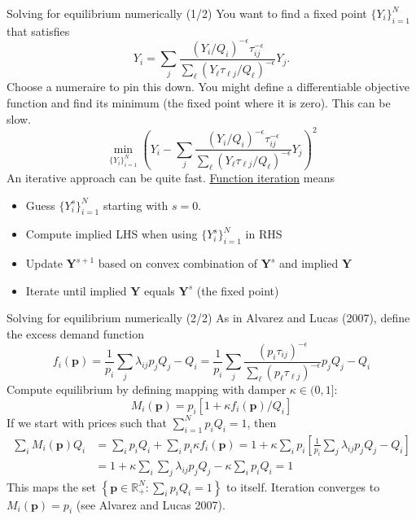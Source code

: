 \documentclass[10pt,notes=hide,aspectratio=169]{beamer}
\begin{document}
\begin{frame}{Solving for equilibrium numerically (1/2)}
You want to find a fixed point $\{Y_i\}_{i=1}^{N}$ that satisfies
$$
Y_i
=
\sum_j \frac{\left(Y_i/Q_i\right)^{-\epsilon} \tau_{ij}^{-\epsilon}}{\sum_{\ell} \left(Y_{\ell} \tau_{\ell j} / Q_{\ell}\right)^{-\epsilon}} Y_j
.$$
Choose a numeraire to pin this down.
You might define a differentiable objective function and find its minimum (the fixed point where it is zero).
This can be slow.
$$
\min_{\{Y_{i}\}_{i=1}^{N}}
\left(Y_i
-
\sum_j \frac{\left(Y_i/Q_i\right)^{-\epsilon} \tau_{ij}^{-\epsilon}}{\sum_{\ell} \left(Y_{\ell} \tau_{\ell j} / Q_{\ell}\right)^{-\epsilon}} Y_j
\right)^2
$$
An iterative approach can be quite fast. \href{https://raw.githack.com/AEM7130/class-repo/master/lecture-notes/04-optimization/04-optimization.html\#40}{Function iteration} means
\begin{itemize}
\item Guess $\{Y_{i}^{s}\}_{i=1}^{N}$ starting with $s=0$.
\item Compute implied LHS when using $\{Y_{i}^{s}\}_{i=1}^{N}$ in RHS
\item Update $\mathbf{Y}^{s+1}$ based on convex combination of $\mathbf{Y}^{s}$ and implied $\mathbf{Y}$
\item Iterate until implied $\mathbf{Y}$ equals $\mathbf{Y}^{s}$ (the fixed point)
\end{itemize}
\end{frame}
\begin{frame}{Solving for equilibrium numerically (2/2)}
As in Alvarez and Lucas (2007), define the excess demand function
$$
f_i(\mathbf{p}) 
=
\frac{1}{p_i} \sum_{j} \lambda_{ij} p_j Q_j - Q_i
=
\frac{1}{p_i} \sum_{j}
\frac{\left(p_i\tau_{ij}\right)^{-\epsilon}}{\sum_{\ell} \left(p_{\ell} \tau_{\ell j}\right)^{-\epsilon}}
p_j Q_j - Q_i
$$
Compute equilibrium by defining mapping with damper $\kappa \in (0,1]$:
$$M_i(\mathbf{p}) = p_i \left[1 + \kappa f_i(\mathbf{p}) / Q_{i}\right]$$
If we start with prices such that $\sum_{i=1}^{N} p_i Q_i = 1$, then
\begin{align*}
\sum_{i} M_i(\mathbf{p}) Q_i
&=
\sum_{i} p_i Q_i + \sum_{i} p_i \kappa f_i(\mathbf{p})
=
1 + \kappa \sum_{i} p_i \left[\frac{1}{p_i} \sum_{j} \lambda_{ij} p_j Q_j - Q_i\right]
\\
&=
1 + \kappa \sum_{i} \sum_{j} \lambda_{ij} p_j Q_j - \kappa \sum_{i} p_i  Q_i
=
1
\end{align*}
This maps the set $\left\{\mathbf{p} \in \mathbb{R}^{N}_{+}: \sum_{i} p_i Q_i = 1\right\}$ to itself.
Iteration converges to $M_{i}(\mathbf{p}) = p_i$ (see Alvarez and Lucas 2007).
\end{frame}
\end{document}
